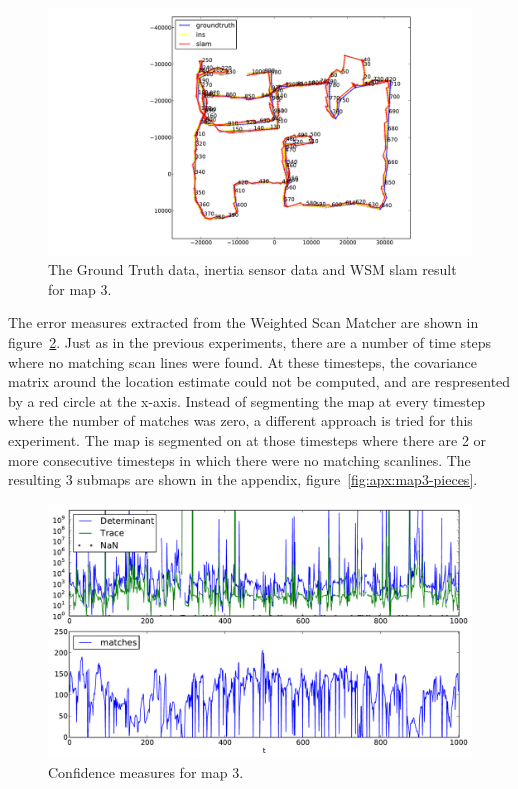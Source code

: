 \begin{figure}[ht]
\centering
  \includegraphics[width=\textwidth]{images/experiment/map3/trace2.pdf}
  \caption{The Ground Truth data, inertia sensor data and WSM slam result for map 3.}
  \label{fig:map3-trace}
\end{figure}

The error measures extracted from the Weighted Scan Matcher are shown in figure~\ref{fig:map3-confidence}. Just as in the previous experiments, there are a number of time steps where no matching scan lines were found. At these timesteps, the covariance matrix around the location estimate could not be computed, and are respresented by a red circle at the x-axis. Instead of segmenting the map at every timestep where the number of matches was zero, a different approach is tried for this experiment. The map is segmented on at those timesteps where there are 2 or more consecutive timesteps in which there were no matching scanlines. The resulting 3 submaps are shown in the appendix, figure~\ref{fig:apx:map3-pieces}.

\begin{figure}[ht]
\centering
  \includegraphics[width=\textwidth]{images/experiment/map3/error-measures.pdf}
  \caption{Confidence measures for map 3.}
  \label{fig:map3-confidence}
\end{figure}

